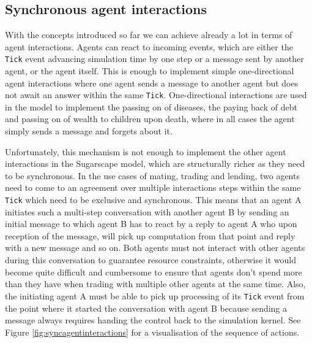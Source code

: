 \subsection{Synchronous agent interactions}
With the concepts introduced so far we can achieve already a lot in terms of agent interactions. Agents can react to incoming events, which are either the \texttt{Tick} event advancing simulation time by one step or a message sent by another agent, or the agent itself. This is enough to implement simple one-directional agent interactions where one agent sends a message to another agent but does not await an answer within the same \texttt{Tick}. One-directional interactions are used in the model to implement the passing on of diseases, the paying back of debt and passing on of wealth to children upon death, where in all cases the agent simply sends a message and forgets about it.

Unfortunately, this mechanism is not enough to implement the other agent interactions in the Sugarscape model, which are structurally richer as they need to be synchronous. In the use cases of mating, trading and lending, two agents need to come to an agreement over multiple interactions steps within the same \texttt{Tick} which need to be exclusive and synchronous. This means that an agent A initiates such a multi-step conversation with another agent B by sending an initial message to which agent B has to react by a reply to agent A who upon reception of the message, will pick up computation from that point and reply with a new message and so on. Both agents must not interact with other agents during this conversation to guarantee resource constraints, otherwise it would become quite difficult and cumbersome to ensure that agents don't spend more than they have when trading with multiple other agents at the same time. Also, the initiating agent A must be able to pick up processing of its \texttt{Tick} event from the point where it started the conversation with agent B because sending a message always requires handing the control back to the simulation kernel. See Figure \ref{fig:syncagentinteractions} for a visualisation of the sequence of actions.

